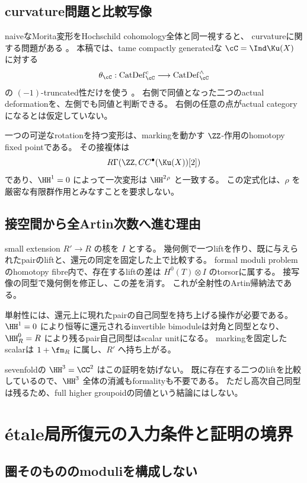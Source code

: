 \subsection{curvature問題と比較写像}

naiveなMorita変形をHochschild cohomology全体と同一視すると、
curvatureに関する問題がある \cite{KL}。
本稿では、tame compactly generatedな \(\cC=\Ind\Ku(X)\) に対する
\[
 \theta_{\cC}:\operatorname{CatDef}_{\cC}^c
 \longrightarrow\operatorname{CatDef}_{\cC}^{\wedge}
\]
の \((-1)\)-truncated性だけを使う \cite{Lurie,BKP}。
右側で同値となった二つのactual deformationを、左側でも同値と判断できる。
右側の任意の点がactual categoryになるとは仮定していない。

一つの可逆なrotationを持つ変形は、markingを動かす \(\ZZ\)-作用のhomotopy fixed pointである。
その接複体は
\[
 R\Gamma(\ZZ,CC^\bullet(\Ku(X))[2])
\]
であり、\(\HH^1=0\) によって一次変形は \(\HH^2{}^\rho\) と一致する。
この定式化は、\(\rho\) を厳密な有限群作用とみなすことを要求しない。

\subsection{接空間から全Artin次数へ進む理由}

small extension \(R'\to R\) の核を \(I\) とする。
幾何側で一つliftを作り、既に与えられたpairのliftと、還元の同定を固定した上で比較する。
formal moduli problemのhomotopy fibre内で、存在するliftの差は
\(H^0(T)\otimes I\) のtorsorに属する。
接写像の同型で幾何側を修正し、この差を消す。
これが全射性のArtin帰納法である。

単射性には、還元上に現れたpairの自己同型を持ち上げる操作が必要である。
\(\HH^1=0\) により恒等に還元されるinvertible bimoduleは対角と同型となり、
\(\HH^0_R=R\) により残るpair自己同型はscalar unitになる。
markingを固定したscalarは \(1+\fm_R\) に属し、\(R'\) へ持ち上がる。

sevenfoldの \(\HH^3=\CC^2\) はこの証明を妨げない。
既に存在する二つのliftを比較しているので、\(\HH^3\) 全体の消滅もformalityも不要である。
ただし高次自己同型は残るため、full higher groupoidの同値という結論にはしない。

\section{étale局所復元の入力条件と証明の境界}

\subsection{圏そのもののmoduliを構成しない}

